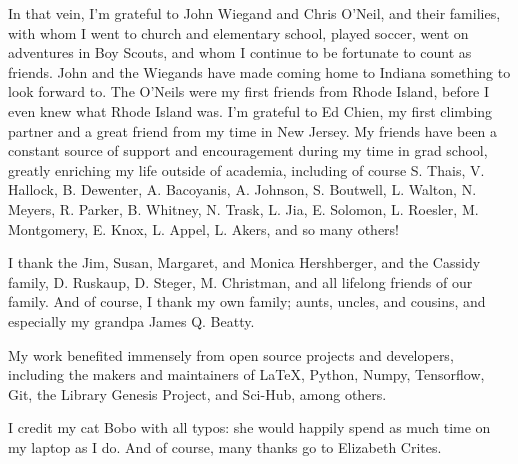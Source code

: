 In that vein, I'm grateful to John Wiegand and Chris O'Neil, and their families, with whom I went to church and elementary school, played soccer, went on adventures in Boy Scouts, and whom I continue to be fortunate to count as friends. John and the Wiegands have made coming home to Indiana something to look forward to.  The O'Neils were my first friends from Rhode Island, before I even knew what Rhode Island was.  I'm grateful to Ed Chien, my first climbing partner and a great friend from my time in New Jersey.   My friends have been a constant source of support and encouragement during my time in grad school, greatly enriching my life outside of academia, including of course S. Thais, V. Hallock, B. Dewenter, A. Bacoyanis, A. Johnson, S. Boutwell, L. Walton, N. Meyers, R. Parker, B. Whitney, N. Trask, L. Jia, E. Solomon, L. Roesler, M. Montgomery, E. Knox, L. Appel, L. Akers, and so many others!

I thank the Jim, Susan, Margaret, and Monica Hershberger, and the Cassidy family, D. Ruskaup, D. Steger, M. Christman, and all lifelong friends of our family.  And of course, I thank my own family; aunts, uncles, and cousins, and especially my grandpa James Q. Beatty.

My work benefited immensely from open source projects and developers, including the makers and maintainers of \LaTeX, Python, Numpy, Tensorflow, Git, the Library Genesis Project, and Sci-Hub, among others.  

I credit my cat Bobo with all typos: she would happily spend as much time on my laptop as I do.  And of course, many thanks go to Elizabeth Crites.
